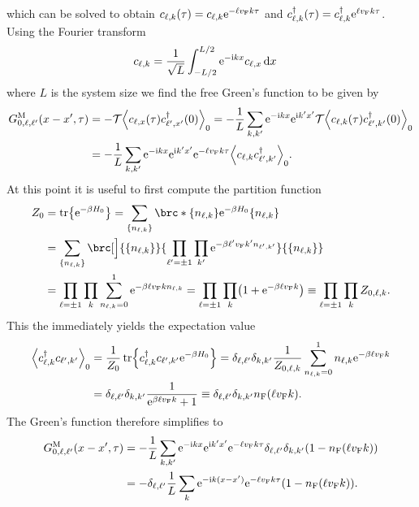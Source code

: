 \documentclass[english, parskip=full]{scrartcl}
\begin{document}
which can be solved to obtain $c_{\ell,k}(\tau) = c_{\ell,k} \text{e}^{-\ell v_{\text{F}} k\tau}$ and $c_{\ell,k}^\dagger(\tau) = c_{\ell,k}^\dagger \text{e}^{\ell v_{\text{F}} k\tau}$.
Using the Fourier transform
\begin{align}
c_{\ell,k} &= \frac{1}{\sqrt{L}} \int_{-L/2}^{L/2} \text{e}^{-\text{i} kx} c_{\ell,x} \,\mathrm{d}x
\end{align}
where $L$ is the system size we find the free Green's function to be given by
\begin{align}
G_{0,\ell,\ell'}^\M(x-x',\tau) &= -\mathcal{T} \bra*{c_{\ell,x}(\tau) c_{\ell',x'}^\dagger(0)}_0 = -\frac{1}{L}\sum_{k,k'} \powe{-\i kx} \powe{\i k'x'} \mathcal{T} \bra*{c_{\ell,k}(\tau) c_{\ell',k'}^\dagger(0)}_0\\
&= -\frac{1}{L}\sum_{k,k'} \powe{-\i kx} \powe{\i k' x'} \powe{-\ell\vf k\tau} \bra*{c_{\ell,k} c_{\ell',k'}^\dagger}_0.
\end{align}
At this point it is useful to first compute the partition function
\begin{align}
Z_0 &= \tr\klc*{\powe{-\beta H_0}} = \sum_{\klc*{n_{\ell,k}}} \brc*{\klc*{n_{\ell,k}}}{\powe{-\beta H_0}}{\klc*{n_{\ell,k}}}\\
&= \sum_{\klc*{n_{\ell,k}}} \brc[\Big]{\klc*{n_{\ell,k}}}{\prod_{\ell'=\pm 1} \prod_{k'} \powe{-\beta \ell'\vf k' n_{\ell',k'}}}{\klc*{n_{\ell,k}}}\\
&= \prod_{\ell=\pm 1} \prod_{k} \sum_{n_{\ell,k}=0}^1 \powe{-\beta \ell \vf k n_{\ell,k}} = \prod_{\ell=\pm 1} \prod_{k} \kla*{1 + \powe{-\beta\ell\vf k}} \equiv \prod_{\ell=\pm 1} \prod_{k} Z_{0,\ell,k}.
\end{align}
This the immediately yields the expectation value
\begin{align}
\bra*{c_{\ell,k}^\dagger c_{\ell',k'}}_0 &= \frac{1}{Z_0} \tr\klc*{c_{\ell,k}^\dagger c_{\ell',k'} \powe{-\beta H_0}} = \delta_{\ell,\ell'} \delta_{k,k'} \frac{1}{Z_{0,\ell,k}} \sum_{n_{\ell,k}=0}^1 n_{\ell,k} \powe{-\beta \ell\vf k} \\
&= \delta_{\ell,\ell'} \delta_{k,k'} \frac{1}{\powe{\beta \ell \vf k} + 1} \equiv \delta_{\ell,\ell'} \delta_{k,k'} n_\F(\ell\vf k).
\end{align}
The Green's function therefore simplifies to
\begin{align}
G_{0,\ell,\ell'}^\M(x-x',\tau) &= -\frac{1}{L}\sum_{k,k'} \powe{-\i kx} \powe{\i k' x'} \powe{-\ell \vf k\tau} \delta_{\ell,\ell'} \delta_{k,k'} \kla*{1 - n_\F(\ell\vf k)}\\
&= -\delta_{\ell,\ell'}\frac{1}{L} \sum_k \powe{-\i k(x-x')} \powe{-\ell\vf k\tau} \kla*{1 - n_\F(\ell\vf k)}.
\end{align}
\end{document}
